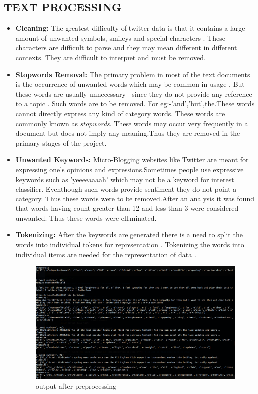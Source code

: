 \subsection{TEXT PROCESSING}
\par
\begin{itemize}

\item \textbf{Cleaning:}
\indent 
The greatest difficulty of twitter data is that it contains a large amount of unwanted symbols, smileys and special characters . These characters are difficult to parse and they may mean different in different contexts. They are difficult to interpret and must be removed. 

\item \textbf{Stopwords Removal:}
\indent 
The primary problem in most of the text documents is the occurrence of unwanted words which may be common in usage . But these words are usually unnecessary , since they do not provide any reference to a topic . Such words are to be removed. For eg:-'and','but',the.These words cannot directly express any kind of category words.
These words are commonly known as \textit{stopwords}. These words may occur very frequently in a document but does not imply any meaning.Thus they are removed in the primary stages of the project.

\item \textbf{Unwanted Keywords:}\indent
Micro-Blogging websites like Twitter are meant for expressing one's
opinions and expressions.Sometimes people use expressive keywords such as 'yeeeeaaaah' which may not be a keyword for interest classifier.  Eventhough such words provide sentiment they do not point a category. Thus these words were to be removed.After an analysis it was found that words having count greater than 12 and less than 3 were considered unwanted. Thus these words were elliminated.

\item \textbf{Tokenizing:}
\indent 
After the keywords are generated there is a need to split the words into individual tokens for representation . Tokenizing the words  into individual items are needed for the representation of data . 

\begin{figure}[!ht]
	\centering
	\includegraphics[width=0.9\linewidth]{preprocess.png}
	\caption{output after preprocessing}
	\label{fig:expression01}
\end{figure}


\end{itemize}
